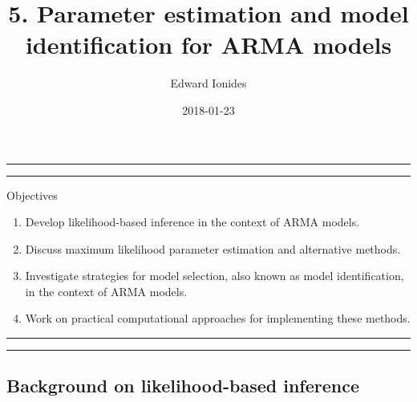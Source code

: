 \documentclass[]{article}
\title{5. Parameter estimation and model identification for ARMA models}
\author{Edward Ionides}
\date{2018-01-23}
\begin{document}
\maketitle

{
\setcounter{tocdepth}{2}
\tableofcontents
}
\newcommand\prob{\mathbb{P}}
\newcommand\E{\mathbb{E}}
\newcommand\var{\mathrm{Var}}
\newcommand\cov{\mathrm{Cov}}
\newcommand\loglik{\ell}
\newcommand\R{\mathbb{R}}
\newcommand\data[1]{#1^*}
\newcommand\estimate[1]{\data{#1}}
\newcommand\params{\, ; \,}
\newcommand\transpose{\scriptsize{T}}
\newcommand\eqspace{\quad\quad\quad}
\newcommand\lik{\mathcal{L}}
\newcommand\profileloglik[1]{\ell^\mathrm{profile}_#1}
\newcommand\ar{\phi}
\newcommand\ma{\psi}




\begin{center}\rule{0.5\linewidth}{\linethickness}\end{center}

\begin{center}\rule{0.5\linewidth}{\linethickness}\end{center}

Objectives

\begin{enumerate}
\def\labelenumi{\arabic{enumi}.}
\item
  Develop likelihood-based inference in the context of ARMA models.
\item
  Discuss maximum likelihood parameter estimation and alternative
  methods.
\item
  Investigate strategies for model selection, also known as model
  identification, in the context of ARMA models.
\item
  Work on practical computational approaches for implementing these
  methods.
\end{enumerate}

\begin{center}\rule{0.5\linewidth}{\linethickness}\end{center}

\begin{center}\rule{0.5\linewidth}{\linethickness}\end{center}

\subsection{Background on likelihood-based
inference}\label{background-on-likelihood-based-inference}
\end{document}
